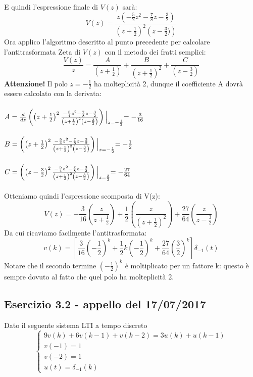 \documentclass[12pt,a4paper]{article}
\begin{document}
\begin{enumerate}
	E quindi l'espressione finale di $V(z)$ sar\`a:
	\[
		V(z) = \frac{z\left(-\frac{5}{2}z^2-\frac{7}{8}z-\frac{3}{2}\right)}{\left(z+\frac{1}{2}\right)^2\left(z-\frac{3}{2})\right)}
	\]
	Ora applico l'algoritmo descritto al punto precedente per calcolare l'antitrasformata Zeta di $V(z)$ con il metodo dei fratti semplici:
	\[
		\frac{V(z)}{z} = \frac{A}{\left(z+\frac{1}{2}\right)} + \frac{B}{\left(z+\frac{1}{2}\right)^2} + \frac{C}{\left(z-\frac{3}{2}\right)}
	\]
	\textbf{Attenzione!} Il polo $z = -\frac{1}{2}$ ha molteplicit\`a 2, dunque il coefficiente A dovr\`a essere calcolato con la derivata:\\ \\
	$A=\frac{d}{dz}\left( \left(z+\frac{1}{2}\right)^2\frac{-\frac{5}{4}z^2-\frac{7}{8}z-\frac{3}{2}}{\left(z+\frac{1}{2}\right)^2\left(z-\frac{3}{2}\right)}\right)\Bigl\vert_{z=-\frac{1}{2}} = -\frac{3}{16}$	\\ \\
	$B=\left(\left(z+\frac{1}{2}\right)^2\frac{-\frac{5}{4}z^2-\frac{7}{8}z-\frac{3}{2}}{\left(z+\frac{1}{2}\right)^2\left(z-\frac{3}{2}\right)}\right)\Bigl\vert_{z=-\frac{1}{2}} = -\frac{1}{2}$ \\ \\
	$C=\left(\left(z-\frac{3}{2}\right)^2\frac{-\frac{5}{4}z^2-\frac{7}{8}z-\frac{3}{2}}{\left(z+\frac{1}{2}\right)^2\left(z-\frac{3}{2}\right)}\right)\Bigl\vert_{z=\frac{3}{2}} = -\frac{27}{64}$ \\ \\
	Otteniamo quindi l'espressione scomposta di V(z):
	\[
		V(z) = -\frac{3}{16}
		\left(\frac{z}{z+\frac{1}{2}}\right)
		+ \frac{1}{2}\left(\frac{z}{(z+\frac{1}{2})^2}\right)
		+ \frac{27}{64}\left(\frac{z}{z-\frac{3}{2}}\right)
	\]
	Da cui ricaviamo facilmente l'antitrasformata:
	\[
		v(k) = \left[\frac{3}{16}\left(-\frac{1}{2}\right)^k + \frac{1}{2}k\left(-\frac{1}{2}\right)^k + \frac{27}{64}\left(\frac{3}{2}\right)^k\right]\delta_{-1}(t)
	\]
	Notare che il secondo termine $\left(-\frac{1}{2}\right)^k$ \`e moltiplicato per un fattore k: questo \`e sempre dovuto al fatto che quel polo ha molteplicit\`a 2.
	\end{enumerate}
	\newpage
	\subsection*{Esercizio 3.2 - appello del 17/07/2017} Dato il seguente sistema LTI a tempo discreto
	\[
		\begin{cases}
			9v(k) + 6v(k-1) + v(k-2) = 3u(k) + u(k-1) \\
			v(-1) = 1 \\
			v(-2) = 1 \\
			u(t) = \delta_{-1}(k)
		\end{cases}
	\]
\end{document}

